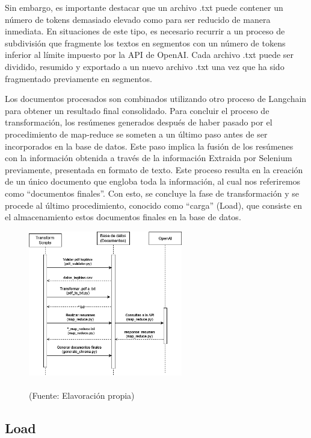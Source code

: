 \par Sin embargo, es importante destacar que un archivo .txt puede contener un número de tokens demasiado elevado como para ser 
reducido de manera inmediata. En situaciones de este tipo, es necesario recurrir a un proceso de subdivisión que fragmente los 
textos en segmentos con un número de tokens inferior al límite impuesto por la API de OpenAI.
Cada archivo .txt puede ser dividido, 
resumido y exportado a un nuevo archivo .txt una vez que ha sido fragmentado previamente en segmentos.

\par Los documentos procesados son combinados utilizando otro proceso de Langchain para obtener un resultado final consolidado. 
Para concluir el proceso de transformación, los resúmenes generados después de haber pasado por el procedimiento de map-reduce 
se someten a un último paso antes de ser incorporados en la base de datos. Este paso implica la fusión de los resúmenes con la 
información obtenida a través de la información Extraida por Selenium previamente, presentada en formato de texto. Este proceso 
resulta en la creación de un único documento que engloba toda la información, al cual nos referiremos como ``documentos finales''. 
Con esto, se concluye la fase de transformación y se procede al último procedimiento, conocido como ``carga'' (Load), que consiste 
en el almacenamiento estos documentos finales en la base de datos.


\begin{figure}[ht!]
    \centering
    \includegraphics[width=0.6\textwidth]{figures/transfrom_diagram.png}
    \caption[]{\\
    {\scriptsize (Fuente: Elavoración propia)}}
    \label{fig:chatbot1}
\end{figure}

\subsection{Load}

